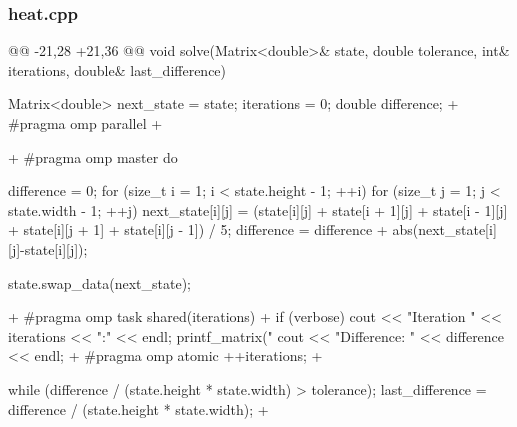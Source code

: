 \newpage

\subsubsection{\textbf{heat.cpp}}
\begin{listing}[firstnumber=20]
    @@ -21,28 +21,36 @@
    void solve(Matrix<double>& state, double tolerance, int& iterations, double& last_difference) {
    Matrix<double> next_state = state;
    iterations = 0;
    double difference;
  + #pragma omp parallel
  + {
  + #pragma omp master
    do {
        difference = 0;
        for (size_t i = 1; i < state.height - 1; ++i) {
            for (size_t j = 1; j < state.width - 1; ++j) {
                next_state[i][j] = (state[i][j]
                                + state[i + 1][j]  
                                + state[i - 1][j]  
                                + state[i][j + 1]  
                                + state[i][j - 1]) / 5;
                difference = difference 
                             + abs(next_state[i][j]-state[i][j]);
            }
        }

        state.swap_data(next_state);

  + #pragma omp task shared(iterations)
  + {    
        if (verbose) {
            cout << "Iteration " << iterations << ":" << endl;
            printf_matrix("%
            cout << "Difference: " << difference << endl;
        }
  + #pragma omp atomic
        ++iterations;
  + }
    } while (difference / (state.height * state.width) > tolerance);
    last_difference = difference / (state.height * state.width);
  + }
    }
\end{listing}



